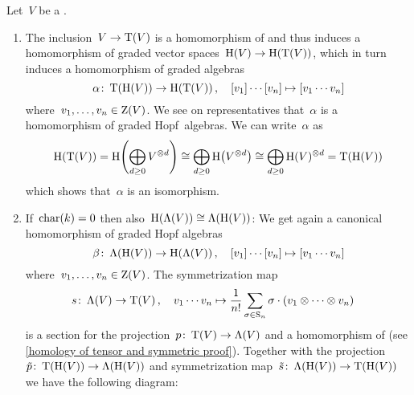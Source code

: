 \documentclass[a4paper,10pt,headings=standardclasses]{scrartcl}
\begin{document}
\begin{example}
  \label{homology of tensor and symmetric}
  Let~$V$ be a {\dgv}.
  \begin{enumerate}
    \item
      The inclusion~$V \to \operatorname{T}(V)$ is a homomorphism of {\dgvs} and thus induces a homomorphism of graded vector spaces~$\operatorname{H}(V) \to \operatorname{H}(\operatorname{T}(V))$, which in turn induces a homomorphism of graded algebras
      \[
        \alpha
        \colon
        \operatorname{T}(\operatorname{H}(V))
        \to
        \operatorname{H}(\operatorname{T}(V)) \,,
        \quad
        [v_1] \dotsm [v_n]
        \mapsto
        [v_1 \dotsm v_n]
      \]
      where~$v_1, \dotsc, v_n \in \operatorname{Z}(V)$.
      We see on representatives that~$\alpha$ is a homomorphism of graded Hopf~algebras.
      We can write~$\alpha$ as
      \[
        \operatorname{H}(\operatorname{T}(V))
        =
        \operatorname{H}\Biggl( \bigoplus_{d \geq 0} V^{\otimes d} \Biggr)
        \cong
        \bigoplus_{d \geq 0} \operatorname{H}\bigl( V^{\otimes d} \bigr)
        \cong
        \bigoplus_{d \geq 0} \operatorname{H}(V)^{\otimes d}
        =
        \operatorname{T}(\operatorname{H}(V))
      \]
      which shows that~$\alpha$ is an isomorphism.
    \item
      If~$\operatorname{char}(k) = 0$ then also~$\operatorname{H}(\operatorname{\Lambda}(V)) \cong \operatorname{\Lambda}(\operatorname{H}(V))$:
      We get again a canonical homomorphism of graded Hopf algebras
      \[
        \beta
        \colon
        \operatorname{\Lambda}(\operatorname{H}(V))
        \to
        \operatorname{H}(\operatorname{\Lambda}(V)) \,,
        \quad
        [v_1] \dotsm [v_n]
        \mapsto
        [v_1 \dotsm v_n]
      \]
      where~$v_1, \dotsc, v_n \in \operatorname{Z}(V)$.
      The symmetrization map
      \begin{align*}
        s
        \colon
        \operatorname{\Lambda}(V)
        \to
        \operatorname{T}(V) \,,
        \quad
        v_1 \dotsm v_n
        &\mapsto
        \frac{1}{n!} \sum_{\sigma \in \operatorname{S}_n}
        \sigma \cdot (v_1 \otimes \dotsb \otimes v_n)
      \end{align*}
      is a section for the projection~$p \colon \operatorname{T}(V) \to \operatorname{\Lambda}(V)$ and a homomorphism of {\dgvs} (see \cref{homology of tensor and symmetric proof}).
      Together with the projection~$\tilde{p} \colon \operatorname{T}(\operatorname{H}(V)) \to \operatorname{\Lambda}(\operatorname{H}(V))$ and symmetrization map~$\tilde{s} \colon \operatorname{\Lambda}(\operatorname{H}(V)) \to \operatorname{T}(\operatorname{H}(V))$ we have the following diagram:

\end{enumerate}
\end{example}
\end{document}
